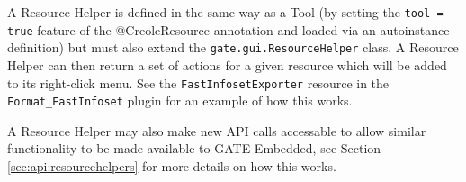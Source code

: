 A Resource Helper is defined in the same way as a Tool (by setting the
\verb|tool = true| feature of the @CreoleResource annotation and loaded via an
autoinstance definition) but must also extend the \verb|gate.gui.ResourceHelper|
class. A Resource Helper can then return a set of actions for a given resource
which will be added to its right-click menu. See the \verb|FastInfosetExporter|
resource in the \verb|Format_FastInfoset| plugin for an example of how this works.

A Resource Helper may also make new API calls accessable to allow similar
functionality to be made available to GATE Embedded, see Section
\ref{sec:api:resourcehelpers} for more details on how this works.
